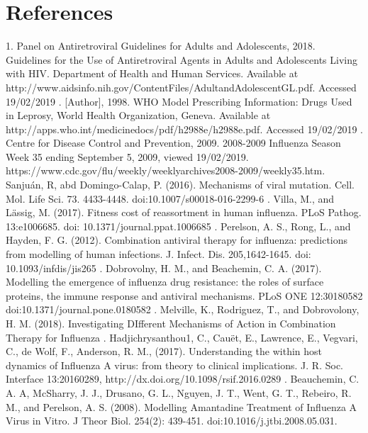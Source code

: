 \documentclass[a4paper,11pt]{article}
\begin{document}
\section*{References}
\small{1. Panel on Antiretroviral Guidelines for Adults and Adolescents, 2018. Guidelines for the Use of Antiretroviral Agents in Adults and Adolescents Living with HIV. Department of Health and Human Services. Available at http://www.aidsinfo.nih.gov/ContentFiles/AdultandAdolescentGL.pdf. Accessed 19/02/2019 . [Author], 1998. WHO Model Prescribing Information: Drugs Used in Leprosy, World Health Organization, Geneva. Available at http://apps.who.int/medicinedocs/pdf/h2988e/h2988e.pdf. Accessed 19/02/2019 . Centre for Disease Control and Prevention, 2009. 2008-2009 Influenza Season Week 35 ending September 5, 2009, viewed 19/02/2019. https://www.cdc.gov/flu/weekly/weeklyarchives2008-2009/weekly35.htm. Sanju\'an, R, abd Domingo-Calap, P. (2016). Mechanisms of viral mutation. Cell. Mol. Life Sci. 73. 4433-4448. doi:10.1007/s00018-016-2299-6 . Villa, M., and L\"assig, M. (2017). Fitness cost of reassortment in human influenza. PLoS Pathog. 13:e1006685. doi: 10.1371/journal.ppat.1006685 . Perelson, A. S., Rong, L., and Hayden, F. G. (2012). Combination antiviral therapy for influenza: predictions from modelling of human infections. J. Infect. Dis. 205,1642-1645. doi: 10.1093/infdis/jis265 . Dobrovolny, H. M., and Beachemin, C. A. (2017). Modelling the emergence of influenza drug resistance: the roles of surface proteins, the immune response and antiviral mechanisms. PLoS ONE 12:30180582 doi:10.1371/journal.pone.0180582 . Melville, K., Rodriguez, T., and Dobrovolony, H. M. (2018). Investigating DIfferent Mechanisms of Action in Combination Therapy for Influenza . Hadjichrysanthou1, C., Cau\"et, E., Lawrence, E., Vegvari, C., de Wolf, F., Anderson, R. M., (2017). Understanding the within host dynamics of Influenza A virus: from theory to clinical implications. J. R. Soc. Interface 13:20160289, http://dx.doi.org/10.1098/rsif.2016.0289 . Beauchemin, C. A. A, McSharry, J. J., Drusano, G. L., Nguyen, J. T., Went, G. T., Rebeiro, R. M., and Perelson, A. S. (2008). Modelling Amantadine Treatment of Influenza A Virus in  Vitro. J Theor Biol. 254(2): 439-451. doi:10.1016/j.jtbi.2008.05.031.\newline
}
\end{document}
